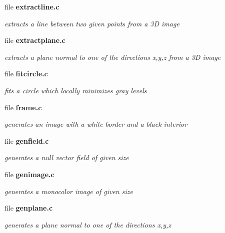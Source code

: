 \begin{CompactItemize}
\item 
file {\bf extractline.c}
\begin{CompactList}\small\item\em extracts a line between two given points from a 3D image \item\end{CompactList}

\item 
file {\bf extractplane.c}
\begin{CompactList}\small\item\em extracts a plane normal to one of the directions x,y,z from a 3D image \item\end{CompactList}

\item 
file {\bf fitcircle.c}
\begin{CompactList}\small\item\em fits a circle which locally minimizes gray levels \item\end{CompactList}

\item 
file {\bf frame.c}
\begin{CompactList}\small\item\em generates an image with a white border and a black interior \item\end{CompactList}

\item 
file {\bf genfield.c}
\begin{CompactList}\small\item\em generates a null vector field of given size \item\end{CompactList}

\item 
file {\bf genimage.c}
\begin{CompactList}\small\item\em generates a monocolor image of given size \item\end{CompactList}

\item 
file {\bf genplane.c}
\begin{CompactList}\small\item\em generates a plane normal to one of the directions x,y,z \item\end{CompactList}


\end{CompactItemize}
